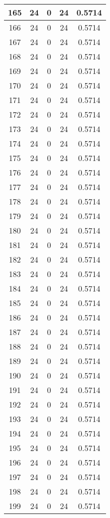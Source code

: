 \documentclass[letterpaper, 12pt]{article}
\begin{document}
\begin{longtable}{|c|c|c|c|c|}
\hline
165 & 24 & 0 & 24 & 0.5714 \\
\hline
166 & 24 & 0 & 24 & 0.5714 \\
\hline
167 & 24 & 0 & 24 & 0.5714 \\
\hline
168 & 24 & 0 & 24 & 0.5714 \\
\hline
169 & 24 & 0 & 24 & 0.5714 \\
\hline
170 & 24 & 0 & 24 & 0.5714 \\
\hline
171 & 24 & 0 & 24 & 0.5714 \\
\hline
172 & 24 & 0 & 24 & 0.5714 \\
\hline
173 & 24 & 0 & 24 & 0.5714 \\
\hline
174 & 24 & 0 & 24 & 0.5714 \\
\hline
175 & 24 & 0 & 24 & 0.5714 \\
\hline
176 & 24 & 0 & 24 & 0.5714 \\
\hline
177 & 24 & 0 & 24 & 0.5714 \\
\hline
178 & 24 & 0 & 24 & 0.5714 \\
\hline
179 & 24 & 0 & 24 & 0.5714 \\
\hline
180 & 24 & 0 & 24 & 0.5714 \\
\hline
181 & 24 & 0 & 24 & 0.5714 \\
\hline
182 & 24 & 0 & 24 & 0.5714 \\
\hline
183 & 24 & 0 & 24 & 0.5714 \\
\hline
184 & 24 & 0 & 24 & 0.5714 \\
\hline
185 & 24 & 0 & 24 & 0.5714 \\
\hline
186 & 24 & 0 & 24 & 0.5714 \\
\hline
187 & 24 & 0 & 24 & 0.5714 \\
\hline
188 & 24 & 0 & 24 & 0.5714 \\
\hline
189 & 24 & 0 & 24 & 0.5714 \\
\hline
190 & 24 & 0 & 24 & 0.5714 \\
\hline
191 & 24 & 0 & 24 & 0.5714 \\
\hline
192 & 24 & 0 & 24 & 0.5714 \\
\hline
193 & 24 & 0 & 24 & 0.5714 \\
\hline
194 & 24 & 0 & 24 & 0.5714 \\
\hline
195 & 24 & 0 & 24 & 0.5714 \\
\hline
196 & 24 & 0 & 24 & 0.5714 \\
\hline
197 & 24 & 0 & 24 & 0.5714 \\
\hline
198 & 24 & 0 & 24 & 0.5714 \\
\hline
199 & 24 & 0 & 24 & 0.5714 \\
\hline
\end{longtable}
\end{document}
